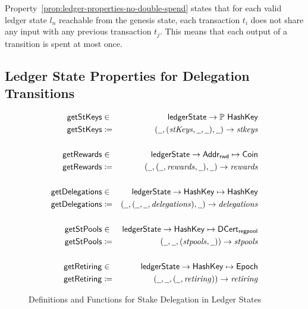 Property~\ref{prop:ledger-properties-no-double-spend} states that for each valid
ledger state $l_{n}$ reachable from the genesis state, each transaction $t_{i}$
does not share any input with any previous transaction $t_{j}$. This means that
each output of a transition is spent at most once.

\subsection{Ledger State Properties for Delegation Transitions}
\label{sec:ledg-prop-deleg}

\begin{figure}[ht]
  \centering
  \begin{align*}
    \fun{getStKeys} & \in & \ledgerState \to \powerset \HashKey \\
    \fun{getStKeys} & \coloneqq & (\wcard, (\var{stKeys}, \wcard, \wcard),
                                  \wcard) \to \var{stkeys} \\
                    &&\\
    \fun{getRewards} & \in & \ledgerState \to \AddrRWD \mapsto \Coin \\
    \fun{getRewards} & \coloneqq & (\wcard, (\wcard, \var{rewards}, \wcard),
                                   \wcard) \to \var{rewards} \\
                    &&\\
    \fun{getDelegations} & \in & \ledgerState \to \HashKey \mapsto \HashKey \\
    \fun{getDelegations} & \coloneqq & (\wcard, (\wcard, \wcard,
                                       \var{delegations}), \wcard) \to
                                       \var{delegations} \\
                    &&\\
    \fun{getStPools} & \in & \ledgerState \to \HashKey \mapsto \DCertRegPool \\
    \fun{getStPools} & \coloneqq & (\wcard, \wcard,
                                   (\var{stpools}, \wcard)) \to \var{stpools} \\
                    &&\\
    \fun{getRetiring} & \in & \ledgerState \to \HashKey \mapsto \Epoch \\
    \fun{getRetiring} & \coloneqq & (\wcard, \wcard,
                                    (\wcard, \var{retiring})) \to \var{retiring} \\
  \end{align*}
  \caption{Definitions and Functions for Stake Delegation in Ledger States}
  \label{fig:stake-delegation-functions}
\end{figure}


